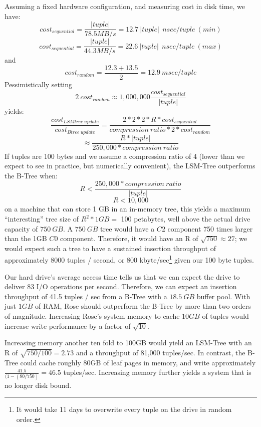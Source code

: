 \documentclass{vldb}
\newcommand{\rows}{Rose\xspace}
\newcommand{\rowss}{Rose's\xspace}
\begin{document}
Assuming a fixed hardware configuration, and measuring cost in disk
time, we have:
\[
   cost_{sequential}=\frac{|tuple|}{78.5MB/s}=12.7~|tuple|~~nsec/tuple~(min)
\]
\[
   cost_{sequential}=\frac{|tuple|}{44.3MB/s}=22.6~|tuple|~~nsec/tuple~(max)
\]
and
\[
   cost_{random}=\frac{12.3+13.5}{2} = 12.9~msec/tuple
\]
Pessimistically setting
\[
2~cost_{random}\approx1,000,000\frac{cost_{sequential}}{|tuple|}
\] yields: \[
    \frac{cost_{LSMtree~update}}{cost_{Btree~update}}=\frac{2*2*2*R*cost_{sequential}}{compression~ratio*2*cost_{random}}
\]
\[
   \approx\frac{R*|tuple|}{250,000*compression~ratio}
\]
If tuples are 100 bytes and we assume a compression ratio of 4 (lower
than we expect to see in practice, but numerically convenient), the
LSM-Tree outperforms the B-Tree when:
\[
    R < \frac{250,000*compression~ratio}{|tuple|}
\]
\[
    R < 10,000
\]
on a machine that can store 1 GB in an in-memory tree, this yields a
maximum ``interesting'' tree size of $R^2*1GB = $ 100 petabytes, well
above the actual drive capacity of $750~GB$.  A $750~GB$ tree would
have a $C2$ component 750 times larger than the 1GB $C0$ component.
Therefore, it would have an R of $\sqrt{750}\approx27$; we would
expect such a tree to have a sustained insertion throughput of
approximately 8000 tuples / second, or 800 kbyte/sec\footnote{It would
  take 11 days to overwrite every tuple on the drive in random order.}
given our 100 byte tuples.

Our hard drive's average access time tells
us that we can expect the drive to deliver 83 I/O operations per
second.  Therefore, we can expect an insertion throughput of 41.5
tuples / sec from a B-Tree with a $18.5~GB$ buffer pool.  With just $1GB$ of RAM, \rows should outperform the
B-Tree by more than two orders of magnitude.  Increasing \rowss system
memory to cache $10 GB$ of tuples would increase write performance by a
factor of $\sqrt{10}$.


Increasing memory another ten fold to 100GB would yield an LSM-Tree
with an R of $\sqrt{750/100} = 2.73$ and a throughput of 81,000
tuples/sec.  In contrast, the B-Tree could cache roughly 80GB of leaf pages
in memory, and write approximately $\frac{41.5}{(1-(80/750)} = 46.5$
tuples/sec.  Increasing memory further yields a system that
is no longer disk bound.
\end{document}
